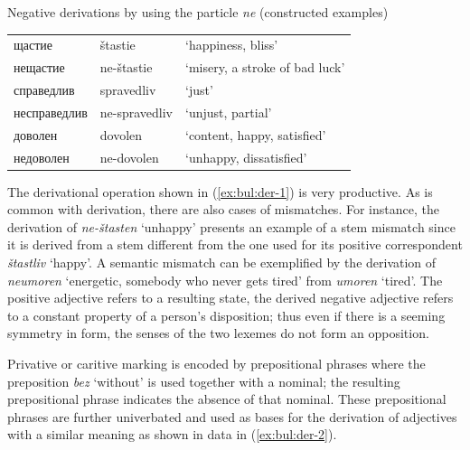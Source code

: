 \documentclass[output=paper,colorlinks=true, citecolor=brown]{langscibook}
\begin{document}
\ea\label{ex:bul:der-1} Negative derivations by using the particle \textit{ne} (constructed examples)

    \begin{tabular}{lll} 
        щастие & štastie  & `happiness, bliss' \\
        нещастие & ne-štastie & `misery, a stroke of bad luck' \medskip \\ 
        справедлив & spravedliv  & `just' \\
        несправедлив & ne-spravedliv & `unjust, partial' \medskip \\ 
        доволен & dovolen  & `content, happy, satisfied' \\
        недоволен & ne-dovolen & `unhappy, dissatisfied' \\
    \end{tabular}
\z

The derivational operation shown in (\ref{ex:bul:der-1}) is very productive. As is common with derivation, there are also cases of mismatches. For instance, the derivation of \textit{ne-štasten} `unhappy' presents an example of a stem mismatch since it is derived from a stem different from the one used for its positive correspondent \textit{štastliv} `happy'. A semantic mismatch can be exemplified by the derivation of \textit{neumoren} `energetic, somebody who never gets tired' from \textit{umoren} `tired'. The positive adjective refers to a resulting state, the derived negative adjective refers to a constant property of a person's disposition; thus even if there is a seeming symmetry in form, the senses of the two lexemes do not form an opposition.

Privative or caritive marking is encoded by prepositional phrases where the preposition \textit{bez} `without' is used together with a nominal; the resulting prepositional phrase indicates the absence of that nominal. These prepositional phrases are further univerbated and used as bases for the derivation of adjectives with a similar meaning as shown in data in (\ref{ex:bul:der-2}).
\end{document}
